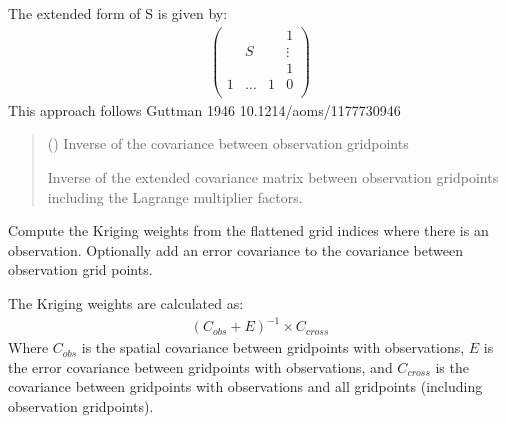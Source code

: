 \documentclass[letterpaper,10pt,english]{sphinxmanual}
\begin{document}
\begin{fulllineitems}
\begin{fulllineitems}
\sphinxAtStartPar
The extended form of S is given by:
\begin{equation*}
\begin{split}\begin{pmatrix}
&   & & 1 \\
& S & & \vdots \\
&   & & 1 \\
1 & \dots & 1 & 0 \\
\end{pmatrix}\end{split}
\end{equation*}
\sphinxAtStartPar
This approach follows Guttman 1946 10.1214/aoms/1177730946
\begin{quote}\begin{description}
\sphinxAtStartPar
{} () \textendash{} Inverse of the covariance between observation grid\sphinxhyphen{}points

\sphinxAtStartPar
Inverse of the extended covariance matrix between observation
grid\sphinxhyphen{}points including the Lagrange multiplier factors.

\sphinxAtStartPar
{}

\end{description}\end{quote}

\end{fulllineitems}


\begin{fulllineitems}
\label{\detokenize{kriging:glomar_gridding.kriging.OrdinaryKriging.get_kriging_weights}}
\pysigstartsignatures
\pysiglinewithargsret
{}
{}
{}
\pysigstopsignatures
\sphinxAtStartPar
Compute the Kriging weights from the flattened grid indices where
there is an observation. Optionally add an error covariance to the
covariance between observation grid points.

\sphinxAtStartPar
The Kriging weights are calculated as:
\begin{equation*}
\begin{split}(C_{obs} + E)^{-1} \times C_{cross}\end{split}
\end{equation*}
\sphinxAtStartPar
Where \(C_{obs}\) is the spatial covariance between grid\sphinxhyphen{}points
with observations, \(E\) is the error covariance between grid\sphinxhyphen{}points
with observations, and \(C_{cross}\) is the covariance between
grid\sphinxhyphen{}points with observations and all grid\sphinxhyphen{}points (including observation
grid\sphinxhyphen{}points).


\end{fulllineitems}
\end{fulllineitems}
\end{document}
